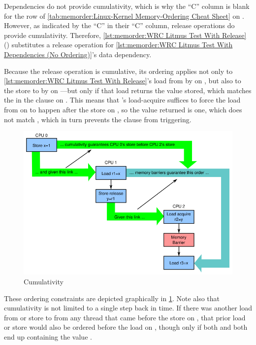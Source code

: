 Dependencies do not provide cumulativity,
which is why the ``C'' column is blank for the  row
of \cref{tab:memorder:Linux-Kernel Memory-Ordering Cheat Sheet}
on
.
However, as indicated by the ``C'' in their ``C'' column,
release operations do provide cumulativity.
Therefore,
\cref{lst:memorder:WRC Litmus Test With Release}
()
substitutes a release operation for
\cref{lst:memorder:WRC Litmus Test With Dependencies (No Ordering)}'s
data dependency.
\begin{fcvref}
Because the release operation is cumulative, its ordering applies not only to
\cref{lst:memorder:WRC Litmus Test With Release}'s
load from  by  on , but also to the store to 
by  on ---but only if that load returns the value stored,
which matches the  in the  clause on .
This means that 's load-acquire suffices to force the
load from  on  to happen after the store on , so
the value returned is one, which does not match , which
in turn prevents the  clause from triggering.
\end{fcvref}

\begin{figure}
\centering
\includegraphics{memorder/memorybarriercum}
\caption{Cumulativity}
\label{fig:memorder:Cumulativity}
\end{figure}

\begin{fcvref}
These ordering constraints are depicted graphically in
\cref{fig:memorder:Cumulativity}.
Note also that cumulativity is not limited to a single step back in time.
If there was another load from  or store to  from any thread
that came before the store on , that prior load or store would also
be ordered before the load on , though only if both  and
 both end up containing the value .
\end{fcvref}

